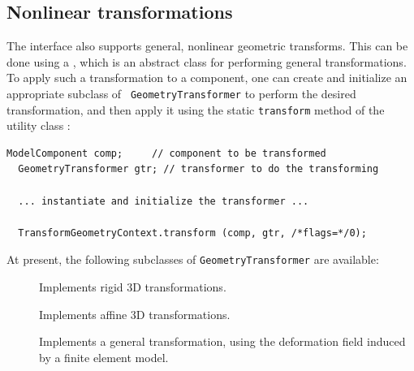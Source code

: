 \subsection{Nonlinear transformations}

The 
interface also supports general, nonlinear geometric transforms.
This can be done using a
, which is an
abstract class for performing general transformations.  To apply such
a transformation to a component, one can create and initialize an appropriate
subclass of {\tt
GeometryTransformer} to perform the desired transformation, and
then apply it using the static {\tt transform} method of the utility class 
:
%
\begin{lstlisting}[]
  ModelComponent comp;     // component to be transformed
  GeometryTransformer gtr; // transformer to do the transforming

  ... instantiate and initialize the transformer ...

  TransformGeometryContext.transform (comp, gtr, /*flags=*/0);
\end{lstlisting}
%

At present, the following subclasses of {\tt GeometryTransformer} are
available:

\begin{description}

\item[]\mbox{}

Implements rigid 3D transformations.

\item[]\mbox{}

Implements affine 3D transformations.

\item[]\mbox{}

Implements a general transformation, using the deformation field
induced by a finite element model. 

\end{description}

